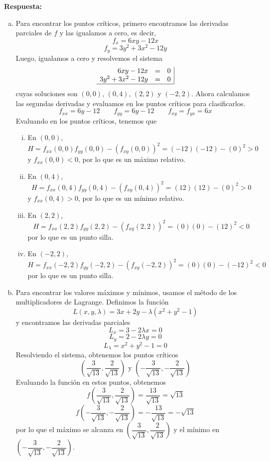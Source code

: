 \documentclass{article}
\begin{document}
\vspace{2mm}
\noindent\textbf{Respuesta:}
\begin{enumerate}[a)]
  \item Para encontrar los puntos críticos, primero encontramos las derivadas parciales de $f$ y las igualamos a cero, es decir,
  $$f_x=6xy-12x$$
  $$f_y=3y^2+3x^2-12y$$
  Luego, igualamos a cero y resolvemos el sistema
  $$\begin{array}{rcl|}
    6xy-12x&=&0\\
    3y^2+3x^2-12y&=&0\\
    \hline
  \end{array}$$
  cuyas soluciones son $(0,0)$, $(0,4)$, $(2,2)$ y $(-2,2)$. Ahora calculamos las segundas derivadas y evaluamos en los puntos críticos para clasificarlos. $$f_{xx}=6y-12\qquad f_{yy}=6y-12\qquad f_{xy}=f_{yx}=6x$$
  Evaluando en los puntos críticos, tenemos que
  \begin{enumerate}[i.]
    \item En $(0,0)$, 
    $$H=f_{xx}(0,0)f_{yy}(0,0)-(f_{xy}(0,0))^2=(-12)(-12)-(0)^2>0$$
    y $f_{xx}(0,0)<0$, por lo que es un máximo relativo.
    \item En $(0,4)$,
    $$H=f_{xx}(0,4)f_{yy}(0,4)-(f_{xy}(0,4))^2=(12)(12)-(0)^2>0$$
    y $f_{xx}(0,4)>0$, por lo que es un mínimo relativo.
    \item En $(2,2)$,
    $$H=f_{xx}(2,2)f_{yy}(2,2)-(f_{xy}(2,2))^2=(0)(0)-(12)^2<0$$
    por lo que es un punto silla.
    \item En $(-2,2)$,
    $$H=f_{xx}(-2,2)f_{yy}(-2,2)-(f_{xy}(-2,2))^2=(0)(0)-(-12)^2<0$$
    por lo que es un punto silla.
  \end{enumerate}
  \newpage
  \item Para encontrar los valores máximos y mínimos, usamos el método de los multiplicadores de Lagrange. Definimos la función
  $$L(x,y,\lambda)=3x+2y-\lambda(x^2+y^2-1)$$
  y encontramos las derivadas parciales
  $$L_x=3-2\lambda x=0$$
  $$L_y=2-2\lambda y=0$$
  $$L_\lambda=x^2+y^2-1=0$$
  Resolviendo el sistema, obtenemos los puntos críticos
  $$\left(\dfrac{3}{\sqrt{13}},\dfrac{2}{\sqrt{13}}\right)\text{ y }\left(-\dfrac{3}{\sqrt{13}},-\dfrac{2}{\sqrt{13}}\right)$$
  Evaluando la función en estos puntos, obtenemos
  $$f\left(\dfrac{3}{\sqrt{13}},\dfrac{2}{\sqrt{13}}\right)=\frac{13}{\sqrt{13}}=\sqrt{13}$$
  $$f\left(-\dfrac{3}{\sqrt{13}},-\dfrac{2}{\sqrt{13}}\right)=-\frac{13}{\sqrt{13}}=-\sqrt{13}$$
  por lo que el máximo se alcanza en $\left(\dfrac{3}{\sqrt{13}},\dfrac{2}{\sqrt{13}}\right)$ y el mínimo en $\left(-\dfrac{3}{\sqrt{13}},-\dfrac{2}{\sqrt{13}}\right)$.
\end{enumerate}
\end{document}

